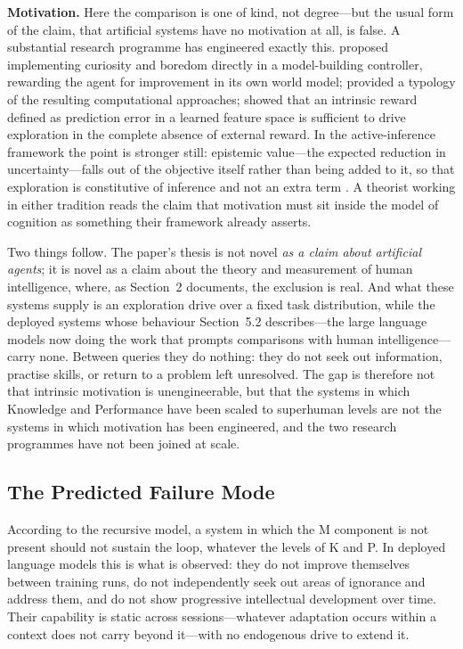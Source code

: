 \documentclass[12pt,a4paper]{article}
\begin{document}
\textbf{Motivation.} Here the comparison is one of kind, not degree---\hspace{0pt}but the usual form of the claim, that artificial systems have no motivation at all, is false. A substantial research programme has engineered exactly this.  proposed implementing curiosity and boredom directly in a model-building controller, rewarding the agent for improvement in its own world model; \citet{Oudeyer2007} provided a typology of the resulting computational approaches; \citet{Pathak2017} showed that an intrinsic reward defined as prediction error in a learned feature space is sufficient to drive exploration in the complete absence of external reward. In the active-inference framework the point is stronger still: epistemic value---\hspace{0pt}the expected reduction in uncertainty---\hspace{0pt}falls out of the objective itself rather than being added to it, so that exploration is constitutive of inference and not an extra term \citep{Friston2015}. A theorist working in either tradition reads the claim that motivation must sit inside the model of cognition as something their framework already asserts.

Two things follow. The paper's thesis is not novel \emph{as a claim about artificial agents}; it is novel as a claim about the theory and measurement of human intelligence, where, as Section~2 documents, the exclusion is real. And what these systems supply is an exploration drive over a fixed task distribution, while the deployed systems whose behaviour Section~5.2 describes---\hspace{0pt}the large language models now doing the work that prompts comparisons with human intelligence---\hspace{0pt}carry none. Between queries they do nothing: they do not seek out information, practise skills, or return to a problem left unresolved. The gap is therefore not that intrinsic motivation is unengineerable, but that the systems in which Knowledge and Performance have been scaled to superhuman levels are not the systems in which motivation has been engineered, and the two research programmes have not been joined at scale.

\subsection{The Predicted Failure Mode}

According to the recursive model, a system in which the M component is not present should not sustain the loop, whatever the levels of K and P. In deployed language models this is what is observed: they do not improve themselves between training runs, do not independently seek out areas of ignorance and address them, and do not show progressive intellectual development over time. Their capability is static across sessions---\hspace{0pt}whatever adaptation occurs within a context does not carry beyond it---\hspace{0pt}with no endogenous drive to extend it.
\end{document}
